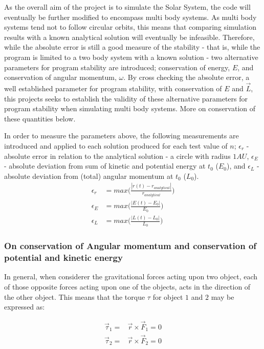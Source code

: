 \documentclass[%
oneside,                 %
final,                   %
10pt]{article}
\begin{document}
As the overall aim of the project is to simulate the Solar System, the code will eventually be further modified to encompass multi body systems. As multi body systems tend not to follow circular orbits, this means that comparing simulation results with a known analytical solution will eventually be infeasible. Therefore, while the absolute error is still a good measure of the stability - that is, while the program is limited to a two body system with a known solution - two alternative parameters for program stability are introduced; conservation of energy, $E$, and  conservation of angular momentum, $\omega$. By cross checking the absolute error, a well established parameter for program stability, with conservation of $E$ and $\vec{L}$, this projects seeks to establish the validity of these alternative parameters for program stability when simulating multi body systems. More on conservation of these quantities below.\newline

In order to measure the parameters above, the following measurements are introduced and applied to each solution produced for each test value of $n$; $\epsilon_r$ - absolute error in relation to the analytical solution - a circle with radius $1AU$, $\epsilon_E$ - absolute deviation from sum of kinetic and potential energy at $t_0$ ($E_0$), and $\epsilon_L$ - absolute deviation from (total) angular momentum at $t_0$ ($L_0$). 
\begin{align}
\epsilon_r&=max\Big(\frac{|r(t)-r_{analytical}|}{r_{analytical}}\Big)\\
\epsilon_E&=max\Big(\frac{|E(t)-E_{0}|}{E_{0}}\Big)\\
\epsilon_L&=max\Big(\frac{|L(t)-L_{0}|}{L_{0}}\Big)
\end{align}
\subsubsection*{On conservation of Angular momentum and conservation of potential and kinetic energy}
In general, when considerer the gravitational forces acting upon  two object, each of those opposite forces acting upon one of the objects, acts in the direction of the other object. This means that the torque $\tau$ for object $1$ and $2$ may be expressed as: 

\begin{align*}
\vec{\tau}_1 =& \vec{r} \times \vec{F}_1 = 0 \\
\vec{\tau}_2 =& \vec{r} \times \vec{F}_2 = 0
\end{align*}
\end{document}
